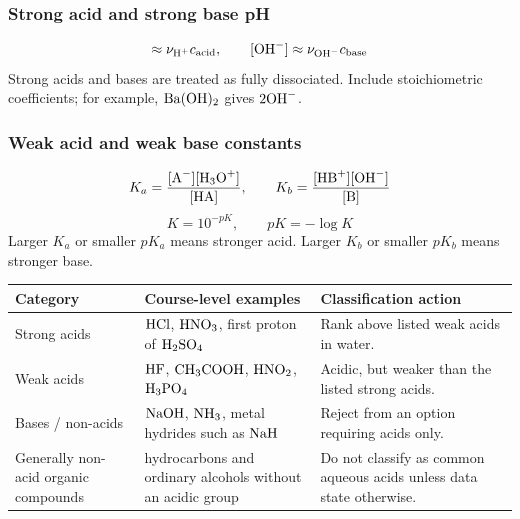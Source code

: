 \subsubsection{Strong acid and strong base pH}
\begin{equation}
[\ce{H3O+}]\approx \nu_{\ce{H+}}c_{\mathrm{acid}}, \qquad
[\ce{OH-}]\approx \nu_{\ce{OH-}}c_{\mathrm{base}}
\label{eq:acid:strong-acid-base}
\end{equation}
Strong acids and bases are treated as fully dissociated. Include stoichiometric coefficients; for example, \(\ce{Ba(OH)2}\) gives \(2\ce{OH-}\).

\subsubsection{Weak acid and weak base constants}
\begin{equation}
K_a=\frac{[\ce{A-}][\ce{H3O+}]}{[\ce{HA}]}, \qquad
K_b=\frac{[\ce{HB+}][\ce{OH-}]}{[\ce{B}]}
\label{eq:acid:weak-equilibrium-constants}
\end{equation}
\begin{equation}
K=10^{-pK}, \qquad pK=-\log K
\label{eq:acid:pk-conversion}
\end{equation}
Larger \(K_a\) or smaller \(pK_a\) means stronger acid. Larger \(K_b\) or smaller \(pK_b\) means stronger base.

\begin{tabular}{@{}>{\raggedright\arraybackslash}p{3.0cm}>{\raggedright\arraybackslash}p{4.5cm}>{\raggedright\arraybackslash}p{4.5cm}@{}}
\toprule
Category & Course-level examples & Classification action\\
\midrule
Strong acids & \(\ce{HCl}\), \(\ce{HNO3}\), first proton of \(\ce{H2SO4}\) & Rank above listed weak acids in water.\\
Weak acids & \(\ce{HF}\), \(\ce{CH3COOH}\), \(\ce{HNO2}\), \(\ce{H3PO4}\) & Acidic, but weaker than the listed strong acids.\\
Bases / non-acids & \(\ce{NaOH}\), \(\ce{NH3}\), metal hydrides such as \(\ce{NaH}\) & Reject from an option requiring acids only.\\
Generally non-acid organic compounds & hydrocarbons and ordinary alcohols without an acidic group & Do not classify as common aqueous acids unless data state otherwise.\\
\bottomrule
\end{tabular}

